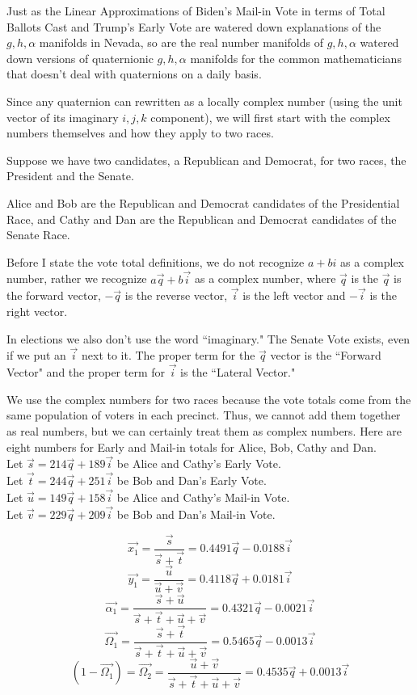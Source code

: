 Just as the Linear Approximations of Biden's Mail-in Vote in terms of Total Ballots Cast and Trump's Early Vote are watered down explanations of the $g,h,\alpha$ manifolds in Nevada, so are the real number manifolds of $g,h,\alpha$ watered down versions of quaternionic $g,h,\alpha$ manifolds for the common mathematicians that doesn't deal with quaternions on a daily basis.

Since any quaternion can rewritten as a locally complex number (using the unit vector of its imaginary $i,j,k$ component), we will first start with the complex numbers themselves and how they apply to two races.

Suppose we have two candidates, a Republican and Democrat, for two races, the President and the Senate.

Alice and Bob are the Republican and Democrat candidates of the Presidential Race, and Cathy and Dan are the Republican and Democrat candidates of the Senate Race.

Before I state the vote total definitions, we do not recognize $a+bi$ as a complex number, rather we recognize $a\vec{q}+b\vec{i}$ as a complex number, where $\vec{q}$ is the $\vec{q}$ is the forward vector, $-\vec{q}$ is the reverse vector, $\vec{i}$ is the left vector and $-\vec{i}$ is the right vector. 

In elections we also don't use the word ``imaginary." The Senate Vote exists, even if we put an $\vec{i}$ next to it. The proper term for the $\vec{q}$ vector is the ``Forward Vector" and the proper term for $\vec{i}$ is the ``Lateral Vector."

We use the complex numbers for two races because the vote totals come from the same population of voters in each precinct. Thus, we cannot add them together as real numbers, but we can certainly treat them as complex numbers.
\newpage
Here are eight numbers for Early and Mail-in totals for Alice, Bob, Cathy and Dan.\\
Let $\vec{s}=214\vec{q}+189\vec{i}$ be Alice and Cathy's Early Vote.\\
Let $\vec{t}=244\vec{q}+251\vec{i}$ be Bob and Dan's Early Vote.\\
Let $\vec{u}=149\vec{q}+158\vec{i}$ be Alice and Cathy's Mail-in Vote.\\
Let $\vec{v}=229\vec{q}+209\vec{i}$ be Bob and Dan's Mail-in Vote.

$$\vec{x_{1}}=\frac{\vec{s}}{\vec{s}+\vec{t}}=0.4491\vec{q}-0.0188\vec{i}$$
$$\vec{y_{1}}=\frac{\vec{u}}{\vec{u}+\vec{v}}=0.4118\vec{q}+0.0181\vec{i}$$
$$\vec{\alpha_{1}}=\frac{\vec{s}+\vec{u}}{\vec{s}+\vec{t}+\vec{u}+\vec{v}}=0.4321\vec{q}-0.0021\vec{i}$$
$$\vec{\Omega_{1}}=\frac{\vec{s}+\vec{t}}{\vec{s}+\vec{t}+\vec{u}+\vec{v}}=0.5465\vec{q}-0.0013\vec{i}$$
$$(1-\vec{\Omega_{1}})=\vec{\Omega_{2}}=\frac{\vec{u}+\vec{v}}{\vec{s}+\vec{t}+\vec{u}+\vec{v}}=0.4535\vec{q}+0.0013\vec{i}$$

